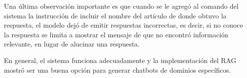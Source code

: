 Una última observación importante es que cuando se le agregó al comando
del sistema la instrucción de incluir el nombre del artículo de donde
obtuvo la respuesta, el modelo dejó de emitir respuestas incorrectas,
es decir, si no conoce la respuesta se limita a mostrar el mensaje
de que no encontró información relevante, en lugar de alucinar una
respuesta.

En general, el sistema funciona adecuadamente y la implementación
del RAG mostró ser una buena opción para generar chatbots de dominios
específicos.
